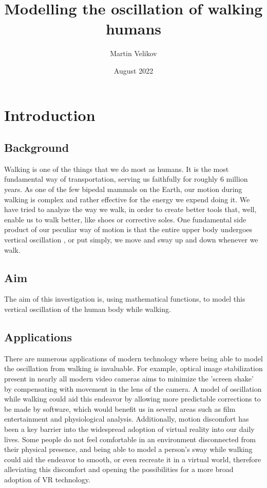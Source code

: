\documentclass[12pt, a4paper]{article}
\title{Modelling the oscillation of walking humans}
\author{Martin Velikov}
\date{August 2022}
\begin{document}
\maketitle
\tableofcontents

\pagebreak
\section{Introduction}
\subsection{Background}
Walking is one of the things that we do most as humans. It is the most
fundamental way of transportation, serving us faithfully for roughly 6 million
years. As one of the few bipedal mammals on the Earth, our motion during walking
is complex and rather effective for the energy we expend doing it. We have tried
to analyze the way we walk, in order to create better tools that, well, enable
us to walk better, like shoes or corrective soles. One fundamental side product
of our peculiar way of motion is that the entire upper body undergoes vertical
oscillation , or put simply, we move and sway up and down whenever we walk.

\subsection{Aim}
The aim of this investigation is, using mathematical functions, to model this
vertical oscillation of the human body while walking.

\subsection{Applications}
There are numerous applications of modern technology where being able to model
the oscillation from walking is invaluable. For example, optical image
stabilization present in nearly all modern video cameras aims to minimize the
'screen shake' by compensating with movement in the lens of the camera. A model
of oscillation while walking could aid this endeavor by allowing more
predictable corrections to be made by software, which would benefit us in
several areas such as film entertainment and physiological analysis.
Additionally, motion discomfort has been a key barrier into the widespread
adoption of virtual reality into our daily lives. Some people do not feel
comfortable in an environment disconnected from their physical presence, and
being able to model a person's sway while walking could aid the endeavor to
smooth, or even recreate it in a virtual world, therefore alleviating this
discomfort and opening the possibilities for a more broad adoption of VR
technology.
\end{document}
